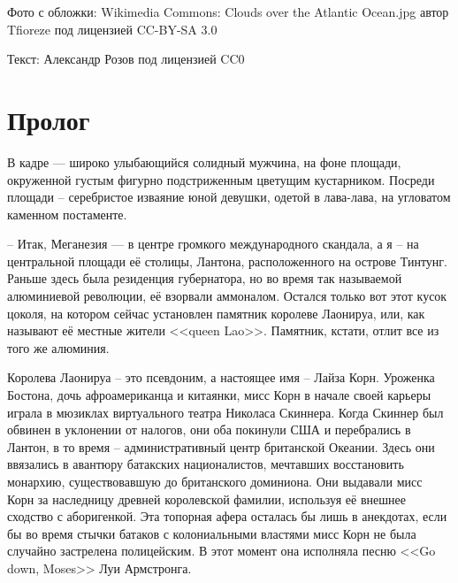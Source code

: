 \maketitle

\thispagestyle{empty}
Фото с обложки: Wikimedia Commons: Clouds over the Atlantic Ocean.jpg автор Tfioreze под лицензией CC-BY-SA 3.0

Текст: Александр Розов под лицензией CC0

\frontmatter

\chapter*{Пролог}

В кадре --- широко улыбающийся солидный мужчина, на фоне площади, окруженной густым фигурно подстриженным цветущим кустарником. Посреди площади -- серебристое изваяние юной девушки, одетой в лава-лава, на угловатом каменном постаменте.

-- Итак, Меганезия --- в центре громкого международного скандала, а я -- на центральной площади её столицы, Лантона, расположенного на острове Тинтунг. Раньше здесь была резиденция губернатора, но во время так называемой алюминиевой революции, её взорвали аммоналом. Остался только вот этот кусок цоколя, на котором сейчас установлен памятник королеве Лаонируа, или, как называют её местные жители <<queen Lao>>. Памятник, кстати, отлит все из того же алюминия.

Королева Лаонируа -- это псевдоним, а настоящее имя -- Лайза Корн. Уроженка Бостона, дочь афроамериканца и китаянки, мисс Корн в начале своей карьеры играла в мюзиклах виртуального театра Николаса Скиннера. Когда Скиннер был обвинен в уклонении от налогов, они оба покинули США и перебрались в Лантон, в то время -- административный центр британской Океании. Здесь они ввязались в авантюру батакских националистов, мечтавших восстановить монархию, существовавшую до британского доминиона. Они выдавали мисс Корн за наследницу древней королевской фамилии, используя её внешнее сходство с аборигенкой. Эта топорная афера осталась бы лишь в анекдотах, если бы во время стычки батаков с колониальными властями мисс Корн не была случайно застрелена полицейским. В этот момент она исполняла песню <<Go down, Moses>> Луи Армстронга.

